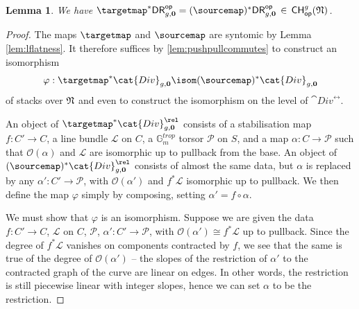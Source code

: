 \documentclass[a4paper,12pt]{article} %
\newcommand{\bb}[1]{{\mathbb{#1}}}
\newcommand{\ca}[1]{{\mathcal{#1}}}
\newcommand{\bd}[1]{{\mathbf{#1}}}
\theoremstyle{definition}
\theoremstyle{plain}%
\newtheorem{lemma}[definition]{Lemma}
\renewcommand{\phi}{\varphi}
\newcommand{\Picabs}{\mathfrak{Pic}}
\newcommand{\Chow}{\mathsf{CH}}
\newcommand{\DRop}{\mathsf{DR}^{\mathsf{op}}}
\begin{document}
\begin{lemma}\label{lem:N_invariance_DR}
We have $\targetmap^*\DRop_{g,\bd 0} = (\sourcemap)^*\DRop_{g, \bd 0} \, \in\, {\mathsf{CH}}^g_{\mathsf{op}}(\frak N)$.
\end{lemma}
\begin{proof}
The maps $\targetmap$ and $\sourcemap$ are syntomic
by Lemma \ref{lem:lflatness}.
It therefore suffices by \cref{lem:pushpullcommutes} to construct an isomorphism $$\phi: \targetmap^*\cat{Div}_{g,\bd 0} \isom (\sourcemap)^*\cat{Div}_{g,\bd 0}$$
of stacks over $\frak N$
and even to construct the isomorphism
on the level of $\cat{Div}^{\rel}$. 


An object of $\targetmap^*\cat{Div}^{\rel}_{g,\bd 0}$ consists of a stabilisation map $f\colon C' \to C$, a line bundle $\ca L$ on $C$, a $\bb G_m^{trop}$ torsor $\ca P$ on $S$, and a map $\alpha \colon C \to \ca P$ such that $\ca O(\alpha )$ and $\ca L$ are isomorphic up to pullback from the base. An object of $(\sourcemap)^*\cat{Div}^{\rel}_{g,\bd 0}$ consists of almost the same data, but $\alpha$ is replaced by any $\alpha'\colon C' \to \ca P$, with $\ca O(\alpha')$ and $f^*\ca L$ isomorphic up to pullback. We then define the map $\phi$ simply by composing, setting $\alpha' = f \circ \alpha$. 

We must show that $\phi$ is an isomorphism.
Suppose we are given the data $f\colon C' \to C$, $\ca L$ on $C$, $\ca P$, $\alpha' \colon C' \to \ca P$, with $\ca O(\alpha') \cong f^*\ca L$ up to pullback. Since the degree of $f^*\ca L$ vanishes on components contracted by $f$, we see that the same is true of the degree of $\ca O(\alpha')$ -- the slopes of the restriction of $\alpha'$ to the contracted graph of the curve are linear on edges. In other words, the restriction is still piecewise linear with integer slopes,  hence we can set $\alpha$ to be the restriction. 
\end{proof}
\end{document}
